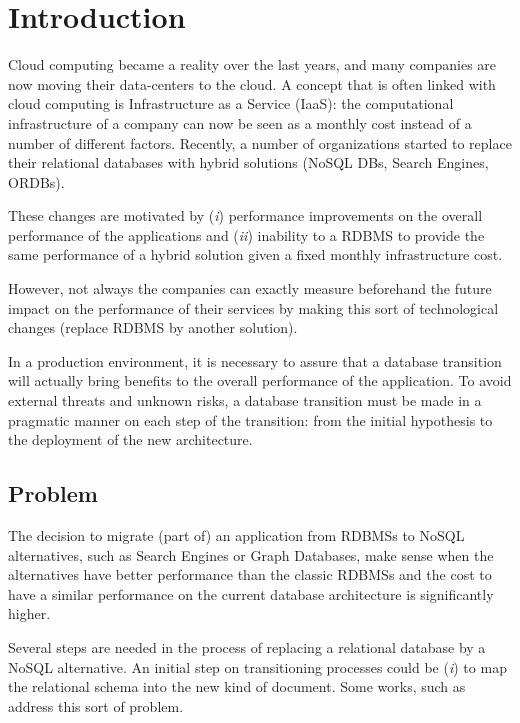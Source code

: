\chapter{Introduction}

Cloud computing became a reality over the last years, and many companies are now moving their data-centers to the cloud. 
A concept that is often linked with cloud computing is Infrastructure as a Service (IaaS): the computational infrastructure of a company can now be seen as a monthly cost instead of a number of different factors. 
Recently, a number of organizations started to replace their relational databases with hybrid solutions (NoSQL DBs, Search Engines, ORDBs). 

These changes are motivated by (\textit{i}) performance improvements on the overall performance of the applications and (\textit{ii}) inability to a RDBMS to provide the same performance of a hybrid solution given a fixed monthly infrastructure cost.

However, not always the companies can exactly measure beforehand the future impact on the performance of their services by making this sort of technological changes (replace RDBMS by another solution).

In a production environment, it is necessary to assure that a database transition will actually bring benefits to the overall performance of the application. To avoid external threats and unknown risks, a database transition must be made in a pragmatic manner on each step of the transition: from the initial hypothesis to the deployment of the new architecture.


\section{Problem}

The decision to migrate (part of) an application from RDBMSs to NoSQL alternatives, such as Search Engines or Graph Databases, make sense when the alternatives have better performance than the classic RDBMSs and the cost to have a similar performance on the current database architecture is significantly higher. 

Several steps are needed in the process of replacing a relational database by a NoSQL alternative. An initial step on transitioning processes could be (\textit{i}) to map the relational schema into the new kind of document. Some works, such as \cite{lombardo2012issues} \cite{zhu2012data} address this sort of problem. 

